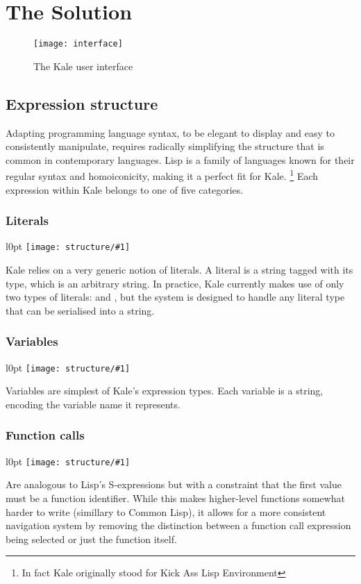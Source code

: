 \chapter{The Solution}

\begin{figure}[t]
\texttt{[image: interface]}
\caption{The Kale user interface}
\end{figure}


\section{Expression structure}

Adapting programming language syntax, to be elegant to display and easy to
consistently manipulate, requires radically simplifying the structure that is
common in contemporary languages. Lisp \citep{McCarthy1960} is a family of
languages known for their regular syntax and homoiconicity, making it a
perfect fit for Kale.%
\footnote{In fact Kale originally stood for Kick Ass Lisp Environment}
Each expression within Kale belongs to one of five categories.

\newcommand{\exprfig}[1]{
	\begin{wrapfigure}{l}{0pt}
    \texttt{[image: structure/\#1]}
	\end{wrapfigure}
}
\subsection{Literals}
\label{expr:literal}
\exprfig{literal}
Kale relies on a very generic notion of literals. A literal is a string
tagged with its type, which is an arbitrary string. In practice, Kale currently
makes use of only two types of literals:  and , but the
system is designed to handle any literal type that can be serialised into a
string.

\needspace{3cm}
\subsection{Variables}
\label{expr:variable}
\exprfig{variable}
Variables are simplest of Kale's expression types. Each variable is a string,
encoding the variable name it represents. 

\subsection{Function calls}
\label{expr:function}
\exprfig{function}
Are analogous to Lisp's S-expressions but with a constraint that the first
value must be a function identifier. While this makes higher-level functions
somewhat harder to write (simillary to Common Lisp), it allows for a more
consistent navigation system by removing the distinction between a function
call expression being selected or just the function itself.

